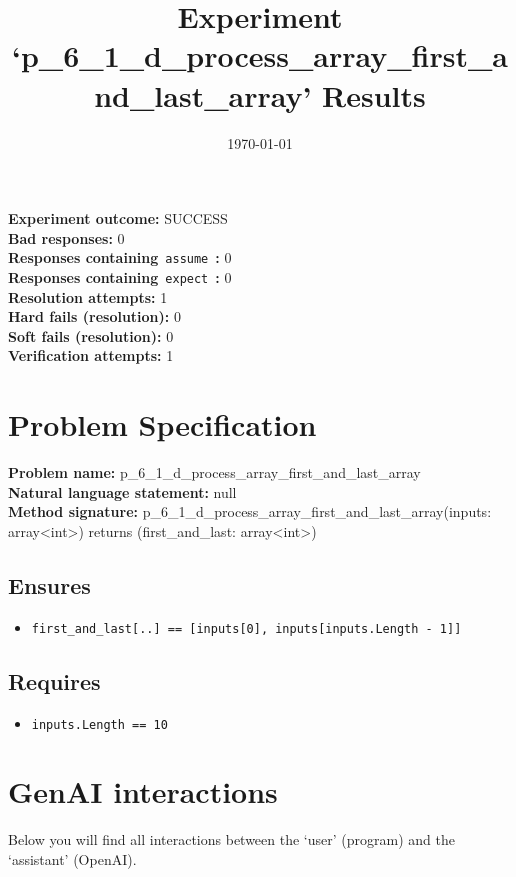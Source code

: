 \documentclass{article}
\begin{document}
\title{Experiment `p\_6\_1\_d\_process\_array\_first\_and\_last\_array' Results}
\author{\today}
\date{}
\maketitle
\textbf{Experiment outcome: }SUCCESS
\\\textbf{Bad responses: }0
\\\textbf{Responses containing}~\texttt{assume}~\textbf{: }0
\\\textbf{Responses containing}~\texttt{expect}~\textbf{: }0
\\\textbf{Resolution attempts: }1
\\\textbf{Hard fails (resolution): }0
\\\textbf{Soft fails (resolution): }0
\\\textbf{Verification attempts: }1
\section*{Problem Specification}
\textbf{Problem name: }p\_6\_1\_d\_process\_array\_first\_and\_last\_array
\\\textbf{Natural language statement: }null
\\\textbf{Method signature: }p\_6\_1\_d\_process\_array\_first\_and\_last\_array(inputs: array<int>) returns (first\_and\_last: array<int>)
\subsection*{Ensures}
\begin{itemize}
\item \texttt{first\_and\_last[..] == [inputs[0], inputs[inputs.Length - 1]]}
\end{itemize}
\subsection*{Requires}
\begin{itemize}
\item \texttt{inputs.Length == 10}
\end{itemize}
\clearpage
\section*{GenAI interactions}
Below you will find all interactions between the `user' (program) and the `assistant' (OpenAI).
\end{document}
